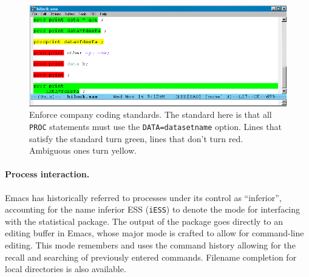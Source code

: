\documentclass{article}
\newif\ifdraft
\newcommand{\stexttt}[1]{{\small\texttt{#1}}}
\newcommand{\emptyfig}{
\hspace*{42pt}\rule{324pt}{.25pt}\\
\hspace*{42pt}\rule{.25pt}{10pc}
\rule{316pt}{.25pt}
\rule{.25pt}{10pc}}
\begin{document}
\begin{figure}[htbp]
  \centering
  \includegraphics[angle=270,width=\textwidth]{hilock-sas}
  \caption{Enforce company coding
    standards.  The standard here is that all \stexttt{PROC}
    statements must use the \stexttt{DATA=datasetname} option.  Lines
    that satisfy the standard turn green, lines that don't turn red.
    Ambiguous ones turn yellow.} %
  \label{f.hilock}
\end{figure}


\paragraph{Process interaction.}
Emacs has historically referred to processes under its control as
``inferior'', accounting for the name inferior ESS (\stexttt{iESS}) to
denote the mode for interfacing with the statistical package.  The
output of the package goes directly to an editing buffer in Emacs,
whose major mode is crafted to allow for command-line editing.  This
mode remembers and uses the command history allowing for the recall and
searching of previously entered commands.  Filename completion for
local directories is also available.%
\end{document}
